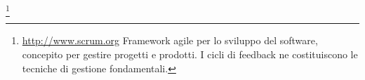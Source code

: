 \footnote{\url{http://www.scrum.org} Framework agile per lo sviluppo del software, concepito per gestire progetti e prodotti. I cicli di feedback
ne costituiscono le tecniche di gestione fondamentali.}
